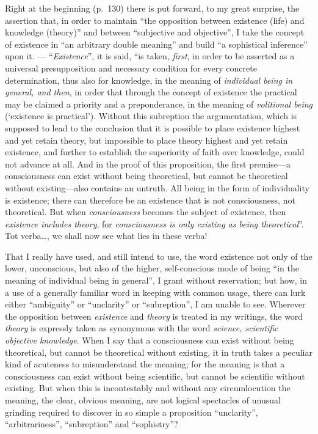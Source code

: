 \documentclass[12pt]{book}
\newcommand{\opage}[1]{\marginnote{\footnotesize\textit{[#1]}}}
\begin{document}
Right at the beginning (p.\ 130) there is put forward, to my great surprise,
the assertion that, in order to maintain ``the opposition between existence
(life) and knowledge (theory)'' and between ``subjective and objective'', I
take the concept of existence in ``an arbitrary double meaning'' and build
``a sophistical inference'' upon it. --- ``\emph{Existence}'', it is said,
``is taken, \emph{first}, in order to be asserted as a universal
presupposition and necessary condition for every concrete determination,
thus also for knowledge, in the meaning of \emph{individual being in
general, and then}, in order that through the concept of existence the
practical may be claimed a priority and a preponderance, in the meaning of
\emph{volitional being} (`existence is practical'). Without this subreption
the argumentation, which is supposed to lead to the conclusion that it is
possible to place existence highest and yet retain theory, but impossible to
place theory highest
\opage{9}\setcounter{footnote}{0}%
and yet retain existence, and further to establish the superiority of faith
over knowledge, could not advance at all. And in the proof of this
proposition, the first premise---a consciousness can exist without being
theoretical, but cannot be theoretical without existing---also contains an
untruth. All being in the form of individuality is existence; there can
therefore be an existence that is not consciousness, not theoretical. But
when \emph{consciousness} becomes the subject of existence, then
\emph{existence includes theory}, for \emph{consciousness is only existing
as being theoretical}''. Tot verba\ldots, we shall now see what lies in
these verba!

That I really have used, and still intend to use, the word existence not
only of the lower, unconscious, but also of the higher, self-conscious mode
of being ``in the meaning of individual being in general'', I grant without
reservation; but how, in a use of a generally familiar word in keeping with
common usage, there can lurk either ``ambiguity'' or ``unclarity'' or
``subreption'', I am unable to see. Wherever the opposition between
\emph{existence} and \emph{theory} is treated in my writings, the word
\emph{theory} is expressly taken as synonymous with the word \emph{science,
scientific objective knowledge}. When I say that a consciousness can exist
without being theoretical, but cannot be theoretical without existing, it in
truth takes a peculiar kind of acuteness to misunderstand the meaning; for
the meaning is that a consciousness can exist without being scientific, but
cannot be scientific without existing. But when this is incontestably and
without any circumlocution the meaning, the clear, obvious meaning, are not
logical spectacles of unusual grinding required to discover in so simple a
\opage{10}\setcounter{footnote}{0}%
proposition ``unclarity'', ``arbitrariness'', ``subreption'' and
``sophistry''?
\end{document}
